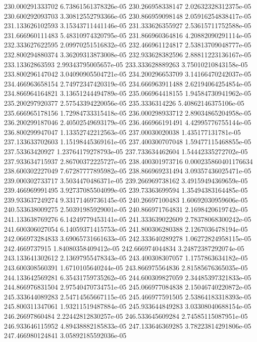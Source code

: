 {230.000291333702 6.73861561378326e-05
230.266958338147 2.02632328312375e-05
230.600292093703 3.30812552793366e-05
230.866959098148 2.05916254838417e-05
231.133626102593 3.15343711441146e-05
231.333626355927 2.53615711752588e-05
231.666960111483 5.48310974320795e-05
231.866960364816 4.20882090291114e-05
232.333627622595 2.09970251516832e-05
232.466961124817 2.53813709048777e-05
232.800294880374 3.36209313873008e-05
232.933628382596 2.88811223136167e-05
233.13362863593 2.99343795005657e-05
233.333628889263 3.75010210843158e-05
233.800296147042 3.04090905504721e-05
234.200296653709 3.14166470242037e-05
234.466963658154 2.74972347420319e-05
234.666963911488 2.62194064254854e-05
234.866964164821 3.13651244494789e-05
235.066964418155 1.94584730941962e-05
235.200297920377 2.57543394220056e-05
235.3336314226 5.40862146375106e-05
235.666965178156 1.72984733315418e-05
236.000298933712 2.89034865204958e-05
236.200299187046 2.40502549693179e-05
236.466966191491 4.42995776755144e-05
236.800299947047 1.13352742212563e-05
237.00030020038 1.435177131781e-05
237.133633702603 1.15198445369161e-05
237.400300707048 1.59477115468855e-05
237.53363420927 1.23764179278793e-05
237.733634462604 1.54442335272702e-05
237.933634715937 2.86700372225727e-05
238.400301973716 0.000235860401176634
238.600302227049 7.67287777895982e-05
238.866969231494 3.09357436025471e-05
239.000302733717 3.5034470486371e-05
239.266969738162 3.49159494369659e-05
239.466969991495 3.92737085504099e-05
239.73363699594 1.35494383164485e-05
239.933637249274 9.33171469736145e-05
240.26697100483 1.60692030959606e-05
240.533638009275 2.50391985929001e-05
240.866971764831 2.1698420619742e-05
241.133638769276 6.14249779453141e-05
241.333639022609 2.78378068300242e-05
241.600306027054 6.14059371415753e-05
241.800306280388 2.1267036478194e-05
242.066973284833 3.69065731661633e-05
242.333640289278 1.06272824958115e-05
242.4669737915 1.84080358409412e-05
242.666974044834 3.24872387292074e-05
243.133641302612 2.13697955478343e-05
243.400308307057 1.1757863634182e-05
243.600308560391 1.6710105640244e-05
243.866975564836 2.81585676365035e-05
244.133642569281 6.35431759735262e-05
244.600309827059 2.34485397321833e-05
244.866976831504 2.97540470734751e-05
245.066977084838 2.15046740220872e-05
245.333644089283 2.54714565667115e-05
245.466977591505 2.53864183318393e-05
245.800311347061 1.93211519487884e-05
245.933644849283 3.03308040688154e-05
246.26697860484 2.22442812830257e-05
246.533645609284 2.74585115087951e-05
246.933646115952 4.89438882185833e-05
247.133646369285 3.78223814291806e-05
247.466980124841 3.05892185592036e-05
}
